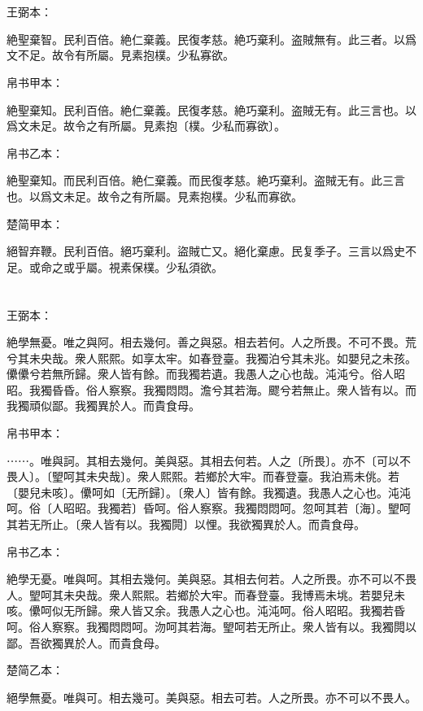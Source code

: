 \documentclass[a5paper]{ctexbook}
\begin{document}
    \chapter{}
    王弼本：

    絶聖棄智。民利百倍。絶仁棄義。民復孝慈。絶巧棄利。盗賊無有。此三者。以爲文不足。故令有所屬。見素抱樸。少私寡欲。

    
    帛书甲本：

    絶聖棄知。民利百倍。絶仁棄義。民復孝慈。絶巧棄利。盗賊无有。此三言也。以爲文未足。故令之有所屬。見素抱〔樸。少私而寡欲〕。

    帛书乙本：

    絶聖棄知。而民利百倍。絶仁棄義。而民復孝慈。絶巧棄利。盗賊无有。此三言也。以爲文未足。故令之有所屬。見素抱樸。少私而寡欲。

    楚简甲本：

    絕智弃鞭。民利百倍。絕巧棄利。盜賊亡又。絕化棄慮。民复季子。三言以爲史不足。或命之或乎屬。視素保樸。少私須欲。

    \chapter{}
    王弼本：

    絶學無憂。唯之與阿。相去幾何。善之與惡。相去若何。人之所畏。不可不畏。荒兮其未央哉。衆人熙熙。如享太牢。如春登臺。我獨泊兮其未兆。如嬰兒之未孩。儽儽兮若無所歸。衆人皆有餘。而我獨若遺。我愚人之心也哉。沌沌兮。俗人昭昭。我獨昏昏。俗人察察。我獨悶悶。澹兮其若海。飂兮若無止。衆人皆有以。而我獨頑似鄙。我獨異於人。而貴食母。

    
    帛书甲本：

    ⋯⋯。唯與訶。其相去幾何。美與惡。其相去何若。人之〔所畏〕。亦不〔可以不畏人〕。〔朢呵其未央哉〕。衆人熙熙。若鄉於大牢。而春登臺。我泊焉未佻。若〔嬰兒未咳〕。儽呵如〔无所歸〕。〔衆人〕皆有餘。我獨遺。我愚人之心也。沌沌呵。俗〔人昭昭。我獨若〕昏呵。俗人察察。我獨悶悶呵。忽呵其若〔海〕。朢呵其若无所止。〔衆人皆有以。我獨䦎〕以悝。我欲獨異於人。而貴食母。

    帛书乙本：

    絶學无憂。唯與呵。其相去幾何。美與惡。其相去何若。人之所畏。亦不可以不畏人。朢呵其未央哉。衆人熙熙。若鄉於大牢。而春登臺。我博焉未垗。若嬰兒未咳。儽呵似无所歸。衆人皆又余。我愚人之心也。沌沌呵。俗人昭昭。我獨若昏呵。俗人察察。我獨悶悶呵。沕呵其若海。朢呵若无所止。衆人皆有以。我獨䦎以鄙。吾欲獨異於人。而貴食母。

    楚简乙本：

    絕學無憂。唯與可。相去幾可。美與惡。相去可若。人之所畏。亦不可以不畏人。
\end{document}
